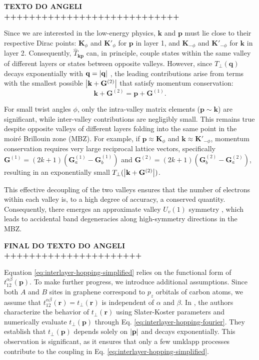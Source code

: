 \textbf{TEXTO DO ANGELI ++++++++++++++++++++++++++++}

Since we are interested in the low-energy physics, \( \mathbf{k} \) and \( \mathbf{p} \) must lie close to their respective Dirac points: \( \mathbf{K}_\phi \) and \( \mathbf{K}'_\phi \) for \( \mathbf{p} \) in layer 1, and \( \mathbf{K}_{-\phi} \) and \( \mathbf{K}'_{-\phi} \) for \( \mathbf{k} \) in layer 2. Consequently, \( \hat{T}_{\mathbf{k}\mathbf{p}} \) can, in principle, couple states within the same valley of different layers or states between opposite valleys. However, since \( T_\perp(\mathbf{q}) \) decays exponentially with \( \mathbf{q} = \abs{\mathbf{q}} \) \cite{tperp-laissardiere2012}, the leading contributions arise from terms with the smallest possible \( \abs{\mathbf{k} + \mathbf{G}^{(2)}} \) that satisfy momentum conservation:
\[
\mathbf{k} + \mathbf{G}^{(2)} = \mathbf{p} + \mathbf{G}^{(1)}.
\]

For small twist angles \( \phi \), only the intra-valley matrix elements (\( \mathbf{p} \sim \mathbf{k} \)) are significant, while inter-valley contributions are negligibly small. This remains true despite opposite valleys of different layers folding into the same point in the moiré Brillouin zone (MBZ). For example, if \( \mathbf{p} \approx \mathbf{K}_\phi \) and \( \mathbf{k} \approx \mathbf{K}'_{-\phi} \), momentum conservation requires very large reciprocal lattice vectors, specifically \( \mathbf{G}^{(1)} = (2k+1)(\mathbf{G}^{(1)}_a - \mathbf{G}^{(1)}_b) \) and \( \mathbf{G}^{(2)} = (2k+1)(\mathbf{G}^{(2)}_b - \mathbf{G}^{(2)}_a) \), resulting in an exponentially small \( T_\perp(\abs{\mathbf{k} + \mathbf{G}^{(2)}}) \).

This effective decoupling of the two valleys ensures that the number of electrons within each valley is, to a high degree of accuracy, a conserved quantity. Consequently, there emerges an approximate valley \( U_v(1) \) symmetry \cite{tperp-laissardiere2012, 69}, which leads to accidental band degeneracies along high-symmetry directions in the MBZ.

\textbf{FINAL DO TEXTO DO ANGELI ++++++++++++++++++++++}

Equation \eqref{eq:interlayer-hopping-simplified} relies on the functional form of \( t_{12}^{\alpha\beta}(\mathbf{p}) \). To make further progress, we introduce additional assumptions. Since both \( A \) and \( B \) sites in graphene correspond to \( p_z \) orbitals of carbon atoms, we assume that \( t_{12}^{\alpha\beta}(\mathbf{r}) = t_\perp(\mathbf{r}) \) is independent of \( \alpha \) and \( \beta \). In \cite{tperp-laissardiere2012}, the authors characterize the behavior of \( t_\perp(\mathbf{r}) \) using Slater-Koster parameters and numerically evaluate \( t_\perp(\mathbf{p}) \) through Eq. \eqref{eq:interlayer-hopping-fourier}. They establish that \( t_\perp(\mathbf{p}) \) depends solely on \( \abs{\mathbf{p}} \) and decays exponentially. This observation is significant, as it ensures that only a few umklapp processes contribute to the coupling in Eq. \eqref{eq:interlayer-hopping-simplified}.

